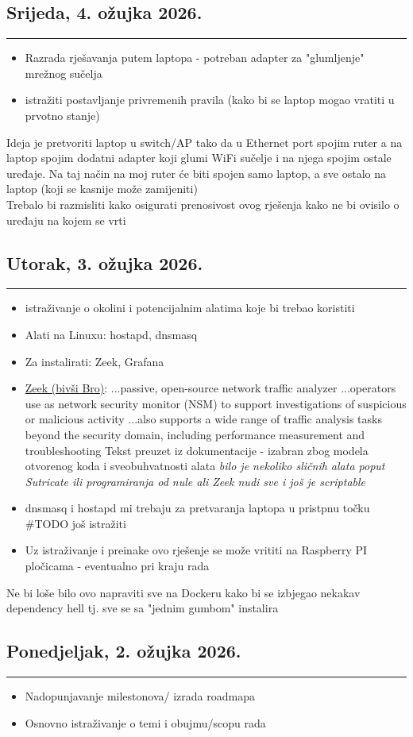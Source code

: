 \documentclass[12pt, a4paper]{article}
\newcommand{\dan}[1]{
    \subsection*{#1}
    \vspace{-0.5em} 
    \hrule \vspace{0.5em} 
}
\begin{document}
\dan{Srijeda, 4. ožujka 2026.}
\begin{itemize}
    \item Razrada rješavanja putem laptopa - potreban adapter za "glumljenje" mrežnog sučelja
    \item istražiti postavljanje privremenih pravila (kako bi se laptop mogao vratiti u prvotno stanje)
\end{itemize}
Ideja je pretvoriti laptop u switch/AP tako da u Ethernet port spojim ruter a na laptop spojim dodatni adapter koji glumi WiFi sučelje
i na njega spojim ostale uređaje. Na taj način na moj ruter će biti spojen samo laptop, a sve ostalo na laptop (koji se kasnije može zamijeniti)
\\ Trebalo bi razmisliti kako osigurati prenosivost ovog rješenja kako ne bi ovisilo o uređaju na kojem se vrti

\dan{Utorak, 3. ožujka 2026.}
\begin{itemize}
    \item istraživanje o okolini i potencijalnim alatima koje bi trebao koristiti
    \item Alati na Linuxu: hostapd, dnsmasq
    \item Za instalirati: Zeek, Grafana
    \item \href{https://zeek.org/get-zeek/}{Zeek (bivši Bro)}:
    \subitem ...passive, open-source network traffic analyzer
    \subitem ...operators use as network security monitor (NSM) to support investigations of suspicious or malicious activity
    \subitem ...also supports a wide range of traffic analysis tasks beyond the security domain, including performance measurement and troubleshooting
    \subitem Tekst preuzet iz dokumentacije - izabran zbog modela otvorenog koda i sveobuhvatnosti alata
    \subitem \textit{bilo je nekoliko sličnih alata poput Sutricate ili programiranja od nule ali Zeek nudi sve i još je scriptable}
    \item dnsmasq i hostapd mi trebaju za pretvaranja laptopa u pristpnu točku \#TODO još istražiti
    \item Uz istraživanje i preinake ovo rješenje se može vrititi na Raspberry PI pločicama - eventualno pri kraju rada
\end{itemize}
Ne bi loše bilo ovo napraviti sve na Dockeru kako bi se izbjegao nekakav dependency hell tj. sve se sa "jednim gumbom" instalira

\dan{Ponedjeljak, 2. ožujka 2026.}
\begin{itemize}
    \item Nadopunjavanje milestonova/ izrada roadmapa
    \item Osnovno istraživanje o temi i obujmu/scopu rada
\end{itemize}
\end{document}
